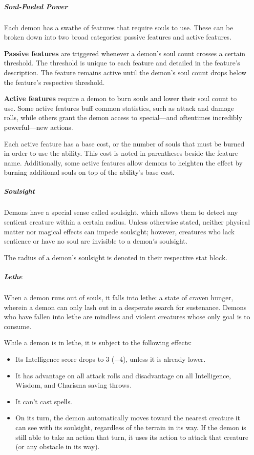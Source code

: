 \documentclass[10pt,a4paper,twoside,bg=print,twocolumn,openany,nodeprecatedcode]{dndbook}
\begin{document}
\subparagraph{Soul-Fueled Power}
Each demon has a swathe of features that require souls to use. These can be broken down into two broad categories: passive features and active features.

\textbf{Passive features} are triggered whenever a demon's soul count crosses a certain threshold. The threshold is unique to each feature and detailed in the feature's description. The feature remains active until the demon's soul count drops below the feature's respective threshold.

\textbf{Active features} require a demon to burn souls and lower their soul count to use. Some active features buff common statistics, such as attack and damage rolls, while others grant the demon access to special—and oftentimes incredibly powerful—new actions.

Each active feature has a base cost, or the number of souls that must be burned in order to use the ability. This cost is noted in parentheses beside the feature name. Additionally, some active features allow demons to heighten the effect by burning additional souls on top of the ability's base cost.

\subparagraph{Soulsight}
Demons have a special sense called soulsight, which allows them to detect any sentient creature within a certain radius. Unless otherwise stated, neither physical matter nor magical effects can impede soulsight; however, creatures who lack sentience or have no soul are invisible to a demon's soulsight.

The radius of a demon's soulsight is denoted in their respective stat block.

\subparagraph{Lethe}
When a demon runs out of souls, it falls into lethe: a state of craven hunger, wherein a demon can only lash out in a desperate search for sustenance. Demons who have fallen into lethe are mindless and violent creatures whose only goal is to consume.

While a demon is in lethe, it is subject to the following effects:


\begin{itemize}
\item Its Intelligence score drops to 3 (−4), unless it is already lower.
\item It has advantage on all attack rolls and disadvantage on all Intelligence, Wisdom, and Charisma saving throws.
\item It can't cast spells.
\item On its turn, the demon automatically moves toward the nearest creature it can see with its soulsight, regardless of the terrain in its way. If the demon is still able to take an action that turn, it uses its action to attack that creature (or any obstacle in its way).
\end{itemize}
\end{document}
